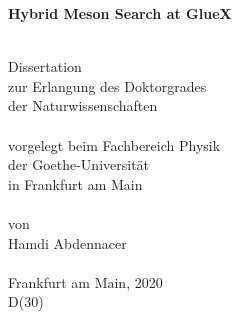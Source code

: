 
\begin{titlepage}
\thispagestyle{empty}

\begin{center}
{\huge\bf Hybrid Meson Search at GlueX}
\par
\mbox{}\\[1.5cm]
{\large Dissertation\\
zur Erlangung des Doktorgrades\\
der Naturwissenschaften}\\
\mbox{}\\[1.5cm]
{\large vorgelegt beim Fachbereich Physik\\
der Goethe-Universit\"at \\
in Frankfurt am Main}\\
\mbox{}\\[1.5cm]
{\large von}\\
\vspace{3mm}
{\large Hamdi Abdennacer}\\
\mbox{}\\[1.5cm]
{\large Frankfurt am Main, 2020}\\
\vspace{4mm}
{\large D(30)}
\end{center}

\newpage
\thispagestyle{empty}
\end{titlepage}